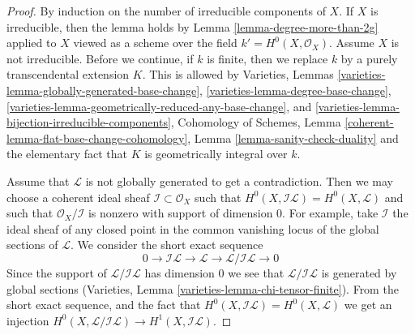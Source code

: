 \begin{proof}
By induction on the number of irreducible components of $X$.
If $X$ is irreducible, then the lemma holds by
Lemma \ref{lemma-degree-more-than-2g}
applied to $X$ viewed as a scheme over the field
$k' = H^0(X, \mathcal{O}_X)$. Assume $X$ is not irreducible.
Before we continue, if $k$ is finite, then we replace $k$
by a purely transcendental extension $K$. This is allowed by
Varieties, Lemmas
\ref{varieties-lemma-globally-generated-base-change},
\ref{varieties-lemma-degree-base-change},
\ref{varieties-lemma-geometrically-reduced-any-base-change}, and
\ref{varieties-lemma-bijection-irreducible-components},
Cohomology of Schemes, Lemma \ref{coherent-lemma-flat-base-change-cohomology},
Lemma \ref{lemma-sanity-check-duality} and the elementary fact that
$K$ is geometrically integral over $k$.

\medskip\noindent
Assume that $\mathcal{L}$ is not globally generated to get a contradiction.
Then we may choose a coherent ideal sheaf
$\mathcal{I} \subset \mathcal{O}_X$ such that
$H^0(X, \mathcal{I}\mathcal{L}) = H^0(X, \mathcal{L})$
and such that $\mathcal{O}_X/\mathcal{I}$ is nonzero with
support of dimension $0$. For example, take $\mathcal{I}$
the ideal sheaf of any closed point in the common
vanishing locus of the global sections of $\mathcal{L}$.
We consider the short exact sequence
$$
0 \to \mathcal{I}\mathcal{L} \to \mathcal{L} \to 
\mathcal{L}/\mathcal{I}\mathcal{L} \to 0
$$
Since the support of $\mathcal{L}/\mathcal{I}\mathcal{L}$
has dimension $0$ we see that $\mathcal{L}/\mathcal{I}\mathcal{L}$
is generated by global sections
(Varieties, Lemma \ref{varieties-lemma-chi-tensor-finite}).
From the short exact sequence,
and the fact that $H^0(X, \mathcal{I}\mathcal{L}) = H^0(X, \mathcal{L})$
we get an injection
$H^0(X, \mathcal{L}/\mathcal{I}\mathcal{L}) \to H^1(X, \mathcal{I}\mathcal{L})$.


\end{proof}
